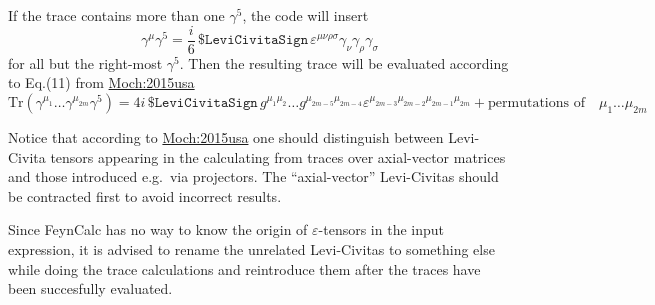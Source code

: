 \documentclass[../FeynCalcManual.tex]{subfiles}
\begin{document}
If the trace contains more than one \(\gamma^5\), the code will insert
\begin{equation}
\gamma^\mu \gamma^5 = \frac{i}{6} \, \texttt{\$LeviCivitaSign} \, \varepsilon^{\mu \nu \rho \sigma} \gamma_\nu \gamma_\rho \gamma_\sigma
\end{equation} for all but the right-most \(\gamma^5\). Then the
resulting trace will be evaluated according to Eq.(11) from
\href{https://arxiv.org/pdf/1506.04517.pdf}{Moch:2015usa}
\begin{equation}
\mathrm{Tr}(\gamma^{\mu_1} \ldots \gamma^{\mu_{2m}} \gamma^5) =  4 i \, \texttt{\$LeviCivitaSign} \, g^{\mu_1 \mu_2} \ldots g^{\mu_{2m-5} \mu_{2m-4}} \varepsilon^{\mu_{2m-3} \mu_{2m-2} \mu_{2m-1} \mu_{2m}} + \textrm{permutations of} \quad \mu_{1} \ldots {\mu_{2m}}
\end{equation}

Notice that according to
\href{https://arxiv.org/pdf/1506.04517.pdf}{Moch:2015usa} one should
distinguish between Levi-Civita tensors appearing in the calculating
from traces over axial-vector matrices and those introduced e.g.~via
projectors. The ``axial-vector'' Levi-Civitas should be contracted first
to avoid incorrect results.

Since FeynCalc has no way to know the origin of \(\varepsilon\)-tensors
in the input expression, it is advised to rename the unrelated
Levi-Civitas to something else while doing the trace calculations and
reintroduce them after the traces have been succesfully evaluated.
\end{document}
